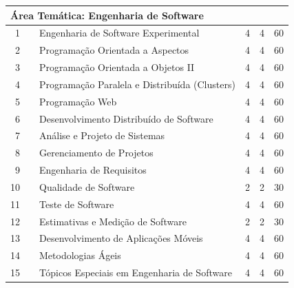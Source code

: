 \documentclass[
	12pt,				%
	openright,			%
  oneside,     %
	a4paper,			%
	chapter=TITLE,		%
	english,			%
	french,				%
	spanish,			%
	brazil				%
	]{abntex2}
\begin{document}
\begin{apendicesenv}
\begin{longtable}{r|r|l|r|r|r}
\multicolumn{6}{l}{\textbf{Área Temática: Engenharia de Software}} \\ \hline
    1     &       & Engenharia de Software Experimental & 4     & 4     & 60 \\ \hline
    2     &       & Programação Orientada a Aspectos & 4     & 4     & 60 \\ \hline
    3     &       & Programação Orientada a Objetos II & 4     & 4     & 60 \\ \hline
    4     &       & Programação Paralela e Distribuída (Clusters) & 4     & 4     & 60 \\ \hline
    5     &       & Programação Web & 4   & 4  & 60 \\ \hline
    6     &       & Desenvolvimento Distribuído de Software & 4     & 4     & 60 \\ \hline
    7     &       & Análise e Projeto de Sistemas & 4     & 4     & 60 \\ \hline
    8     &       & Gerenciamento de Projetos & 4     & 4     & 60 \\ \hline
    9     &       & Engenharia de Requisitos & 4     & 4     & 60 \\ \hline
    10    &       & Qualidade de Software & 2     & 2     & 30 \\ \hline
    11    &       & Teste de Software & 4     & 4     & 60 \\ \hline
    12    &       & Estimativas e Medição de Software & 2     & 2     & 30 \\ \hline
    13    &       & Desenvolvimento de Aplicações Móveis & 4     & 4     & 60 \\ \hline
    14    &       & Metodologias Ágeis & 4     & 4     & 60 \\ \hline
    15    &       & \small{Tópicos Especiais em Engenharia de Software} & 4     & 4     & 60 \\ \hline


\end{longtable}
\end{apendicesenv}
\end{document}
